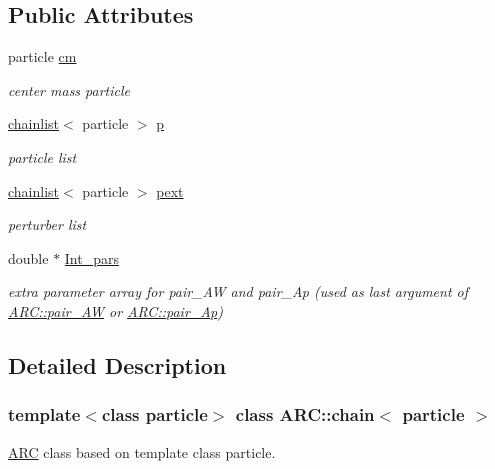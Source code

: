 \subsection*{Public Attributes}
\begin{DoxyCompactItemize}
\item 
particle \hyperlink{classARC_1_1chain_ae9f6a5cbf7aac2b33c7274e7e10916ed}{cm}
\begin{DoxyCompactList}\small\item\em center mass particle \end{DoxyCompactList}\item 
\hyperlink{classARC_1_1chainlist}{chainlist}$<$ particle $>$ \hyperlink{classARC_1_1chain_af1793b656e139e1f87c2e0a55f87514b}{p}
\begin{DoxyCompactList}\small\item\em particle list \end{DoxyCompactList}\item 
\hyperlink{classARC_1_1chainlist}{chainlist}$<$ particle $>$ \hyperlink{classARC_1_1chain_a6e4f41c7d3f8d44a4a01734ff4ab20cf}{pext}
\begin{DoxyCompactList}\small\item\em perturber list \end{DoxyCompactList}\item 
double $\ast$ \hyperlink{classARC_1_1chain_ada3f98172a98cdf9a64abacfe95f9cd8}{Int\+\_\+pars}
\begin{DoxyCompactList}\small\item\em extra parameter array for pair\+\_\+\+AW and pair\+\_\+\+Ap (used as last argument of \hyperlink{namespaceARC_a5c4308ca4a8d0e0ff59fdce30f00274c}{A\+R\+C\+::pair\+\_\+\+AW} or \hyperlink{namespaceARC_aed8f19a0c6ae7dc0bb3696b337d7b9f6}{A\+R\+C\+::pair\+\_\+\+Ap}) \end{DoxyCompactList}\end{DoxyCompactItemize}


\subsection{Detailed Description}
\subsubsection*{template$<$class particle$>$\newline
class A\+R\+C\+::chain$<$ particle $>$}

\hyperlink{namespaceARC}{A\+RC} class based on template class particle. 

